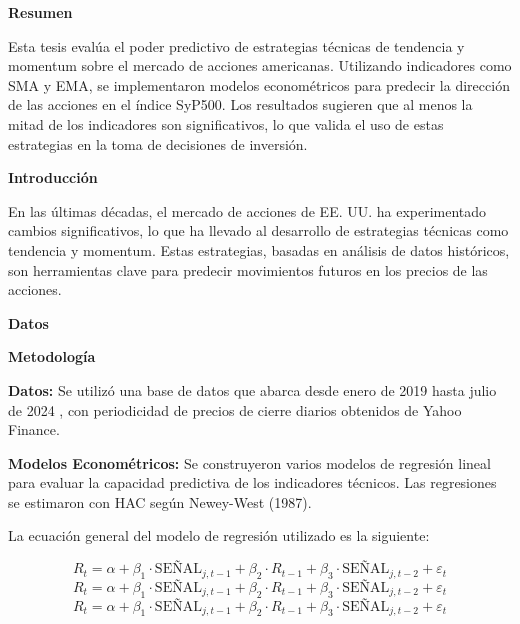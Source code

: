 \documentclass[a0,portrait]{a0poster}
\newcommand{\customsection}[1]{
    \begin{center}
        \begin{tcolorbox}[colframe=miRojo!50, colback=miRojo, width=\linewidth, boxrule=1mm, arc=3mm, auto outer arc]
            \begin{center}
            \vspace{.5cm} %
            \color{white}
            \textbf{\Huge #1}
            \color{miRojo}
            \vspace{.5cm} %
            \end{center}
        \end{tcolorbox}
    \end{center}
}
\begin{document}
\vspace{2cm}
\normalsize %
\begin{multicols}{2}

    \customsection{Resumen}
    \par
    Esta tesis evalúa el poder predictivo de estrategias técnicas de tendencia y momentum sobre el mercado de acciones americanas. Utilizando indicadores como SMA y EMA, se implementaron modelos econométricos para predecir la dirección de las acciones en el índice SyP500. Los resultados sugieren que al menos la mitad de los indicadores son significativos, lo que valida el uso de estas estrategias en la toma de decisiones de inversión.
    
    \customsection{Introducción}
    \par
     En las últimas décadas, el mercado de acciones de EE. UU. ha experimentado cambios significativos, lo que ha llevado al desarrollo de estrategias técnicas como tendencia y momentum. Estas estrategias, basadas en análisis de datos históricos, son herramientas clave para predecir movimientos futuros en los precios de las acciones.
    \customsection{Datos}
    \par
    \textbf{}
    \customsection{Metodología}
    \par
    \textbf{Datos:} Se utilizó una base de datos que abarca desde enero de 2019 hasta julio de 2024 , con periodicidad de precios de cierre diarios obtenidos de Yahoo Finance. 
    \par
    \textbf{Modelos Econométricos:} Se construyeron varios modelos de regresión lineal para evaluar la capacidad predictiva de los indicadores técnicos. Las regresiones se estimaron con HAC según Newey-West (1987).
    
    La ecuación general del modelo de regresión utilizado es la siguiente:
   
    \begin{equation}
        R_t = \alpha + \beta_1 \cdot \text{SEÑAL}_{j,t-1} + \beta_2 \cdot R_{t-1} + \beta_3 \cdot \text{SEÑAL}_{j,t-2} + \varepsilon_t    
    \end{equation}
    \begin{equation}
        R_t = \alpha + \beta_1 \cdot \text{SEÑAL}_{j,t-1} + \beta_2 \cdot R_{t-1} + \beta_3 \cdot \text{SEÑAL}_{j,t-2} + \varepsilon_t    
    \end{equation}
    \begin{equation}
        R_t = \alpha + \beta_1 \cdot \text{SEÑAL}_{j,t-1} + \beta_2 \cdot R_{t-1} + \beta_3 \cdot \text{SEÑAL}_{j,t-2} + \varepsilon_t    
    \end{equation}
    

\end{multicols}
\end{document}

